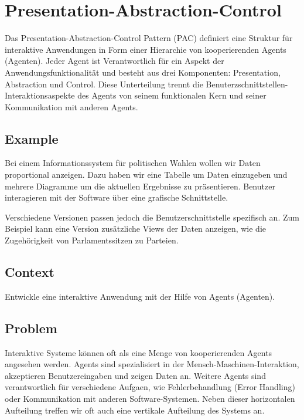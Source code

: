 \section{Presentation-Abstraction-Control}


Das Presentation-Abstraction-Control Pattern (PAC) definiert eine Struktur für interaktive Anwendungen in Form einer Hierarchie von kooperierenden Agents (Agenten). Jeder Agent ist Verantwortlich für ein Aspekt der Anwendungsfunktionalität und besteht aus drei Komponenten: Presentation, Abstraction und Control. Diese Unterteilung trennt die Benuterzschnittstellen-Interaktionsaspekte des Agents von seinem funktionalen Kern und seiner Kommunikation mit anderen Agents.

\subsection*{Example}


Bei einem Informationssystem für politischen Wahlen wollen wir Daten proportional anzeigen. Dazu haben wir eine Tabelle um Daten einzugeben und mehrere Diagramme um die aktuellen Ergebnisse zu präsentieren. Benutzer interagieren mit der Software über eine grafische Schnittstelle.

Verschiedene Versionen passen jedoch die Benutzerschnittstelle spezifisch an. Zum Beispiel kann eine Version zusätzliche Views der Daten anzeigen, wie die Zugehörigkeit von Parlamentssitzen zu Parteien.

\subsection*{Context}


Entwickle eine interaktive Anwendung mit der Hilfe von Agents (Agenten).

\subsection*{Problem}


Interaktive Systeme können oft als eine Menge von kooperierenden Agents angesehen werden. Agents sind spezialisiert in der Mensch-Maschinen-Interaktion, akzeptieren Benutzereingaben und zeigen Daten an. Weitere Agents sind verantwortlich für verschiedene Aufgaen, wie Fehlerbehandlung (Error Handling) oder Kommunikation mit anderen Software-Systemen. Neben dieser horizontalen Aufteilung treffen wir oft auch eine vertikale Aufteilung des Systems an.


